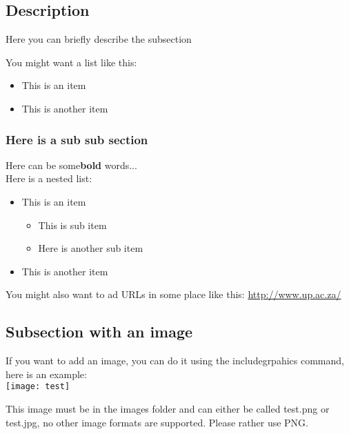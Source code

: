 \subsection{Description}


\begin{description}
\item Here you can briefly describe the subsection 
\end{description}

You might want a list like this: 

	\begin{itemize}	
		\item This is an item
		\item This is another item
	\end{itemize}


\subsubsection{Here is a sub sub section}

 Here can be some\textbf{bold}  words... \\

Here is a nested list: \\

\begin{itemize}	
		\item This is an item
			\begin{itemize}
				\item This is sub item
				\item Here is another sub item
			\end{itemize}
		\item This is another item
	\end{itemize}

You might also want to ad URLs in some place like this: \url{http://www.up.ac.za/} \\

\subsection{Subsection with an image}

If you want to add an image, you can do it using the includegrpahics command, here is an example: \\

\texttt{[image: test]}

This image must be in the images folder and can either be called test.png or test.jpg, no other image formats are supported. Please rather use PNG. 